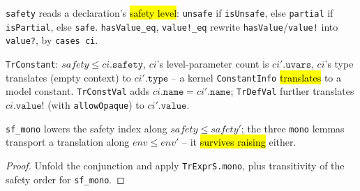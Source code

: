 \begin{definition}
\label{family:constant-info-basics}
\leanok
{}

 \texttt{safety} reads a declaration's \hl{safety level}: \texttt{unsafe}
if \texttt{isUnsafe}, else \texttt{partial} if \texttt{isPartial}, else \texttt{safe}.
\texttt{hasValue\_eq}, \texttt{value!\_eq} rewrite \texttt{hasValue}/\texttt{value!} into
\texttt{value?}, by \texttt{cases ci}.
\end{definition}

\begin{definition}
\label{def:tr-constant}
\leanok
{}

 \texttt{TrConstant}: $safety \le ci.\mathtt{safety}$, $ci$'s
level-parameter count is $ci'.\mathtt{uvars}$, $ci$'s type translates (empty context) to
$ci'.\mathtt{type}$ -- a kernel \texttt{ConstantInfo} \hl{translates} to a model constant.
\texttt{TrConstVal} adds $ci.\mathtt{name} = ci'.\mathtt{name}$; \texttt{TrDefVal} further
translates $ci.\mathtt{value!}$ (with \texttt{allowOpaque}) to $ci'.\mathtt{value}$.
\end{definition}

\begin{lemma}
\label{family:tr-constant-mono}
\leanok
{}

 \texttt{sf\_mono} lowers the safety index along $safety \le safety'$; the
three \texttt{mono} lemmas transport a translation along $env \le env'$ -- it \hl{survives
raising} either.
\end{lemma}
\begin{proof}
\leanok
{} Unfold the conjunction and apply \texttt{TrExprS.mono}, plus transitivity of the
safety order for \texttt{sf\_mono}.
\end{proof}

